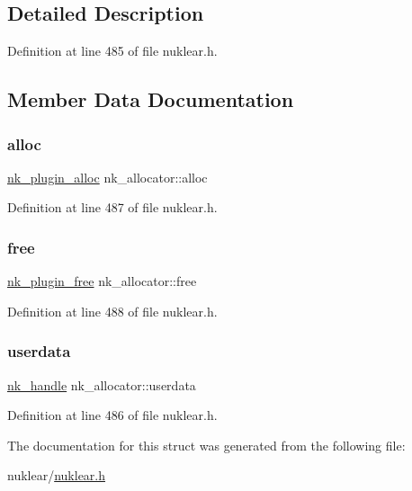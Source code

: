 \subsection{Detailed Description}


Definition at line 485 of file nuklear.\+h.



\subsection{Member Data Documentation}
\mbox{\label{structnk__allocator_ad99f758ced10853bb1cb6f56b6c586f9}} 
\subsubsection{\texorpdfstring{alloc}{alloc}}
{\footnotesize\ttfamily \mbox{\hyperlink{nuklear_8h_adfbbdf36c71cbe9f11c87fda00126cb0}{nk\+\_\+plugin\+\_\+alloc}} nk\+\_\+allocator\+::alloc}



Definition at line 487 of file nuklear.\+h.

\mbox{\label{structnk__allocator_af190be0e199490790ccc1f2877c2d77e}} 
\subsubsection{\texorpdfstring{free}{free}}
{\footnotesize\ttfamily \mbox{\hyperlink{nuklear_8h_aa6efffb60b73f429d5d4cce5a6fd4045}{nk\+\_\+plugin\+\_\+free}} nk\+\_\+allocator\+::free}



Definition at line 488 of file nuklear.\+h.

\mbox{\label{structnk__allocator_a15aa4d412b676a8578ed07f73eac6455}} 
\subsubsection{\texorpdfstring{userdata}{userdata}}
{\footnotesize\ttfamily \mbox{\hyperlink{unionnk__handle}{nk\+\_\+handle}} nk\+\_\+allocator\+::userdata}



Definition at line 486 of file nuklear.\+h.



The documentation for this struct was generated from the following file\+:\begin{DoxyCompactItemize}
\item 
nuklear/\mbox{\hyperlink{nuklear_8h}{nuklear.\+h}}\end{DoxyCompactItemize}
